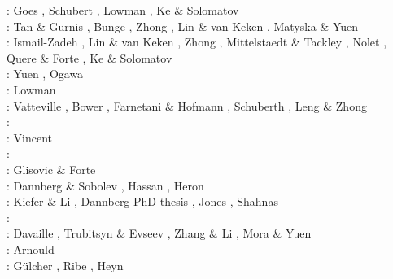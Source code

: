 \begin{scriptsize}
\twothousandfour: Goes \etal \cite{goch04}, Schubert \etal \cite{scmo04}, Lowman \etal \cite{lokg04},
                  Ke \& Solomatov \cite{keso04} \\
\twothousandfive: Tan \& Gurnis \cite{tagu05}, Bunge \cite{bung05}, Zhong \cite{zhon05}, 
                  Lin \& van Keken \cite{liva05}, Matyska \& Yuen \cite{mayu05}\\
\twothousandsix: Ismail-Zadeh \etal \cite{isst06}, Lin \& van Keken \cite{liva06a,liva06b}, 
                 Zhong \cite{zhon06}, Mittelstaedt \& Tackley \cite{mita06},
                 Nolet \etal \cite{nokm06}, Quere \& Forte \cite{qufo06}, Ke \& Solomatov \cite{keso06}\\
\twothousandseven: Yuen \etal \cite{yumh07}, Ogawa \cite{ogaw07}\\
\twothousandeight: Lowman \etal \cite{logg08} \\
\twothousandnine: Vatteville \etal \cite{vavl09}, Bower \etal \cite{bogj09},
                  Farnetani \& Hofmann \cite{faho09}, Schuberth \etal \cite{scbs09b},
                  Leng \& Zhong \cite{lezh09}\\
\twothousandeleven: \cite{toyu11}\cite{talz11}\cite{burk11}\cite{memm11}\cite{dalt11}\cite{tree11}\\
\twothousandtwelve: Vincent \etal{} \cite{viym12}\\
\twothousandthirteen: \cite{dagm13}\cite{madd13}\cite{ande13}\cite{vadv13}\\
\twothousandfourteen: Glisovic \& Forte \cite{glfo14} \\
\twothousandfifteen: Dannberg \& Sobolev \cite{daso15}, Hassan \etal \cite{hafg15}, 
                     Heron \etal \cite{hels15}\\
\twothousandsixteen: Kiefer \& Li \cite{kili16}, Dannberg PhD thesis \cite{dannbergphd}, 
                     Jones \etal \cite{jodc16}, Shahnas \etal \cite{shpy16}\\
\twothousandseventeen: \cite{moyu17}\cite{lizh17}\\
\twothousandeighteen: Davaille \etal \cite{dacc18}, Trubitsyn \& Evseev \cite{trev18}, 
                      Zhang \& Li \cite{zhli18}, Mora \& Yuen \cite{moyu18}\\
\twothousandnineteen: Arnould \etal \cite{argc19}\\
\twothousandtwenty: G{\"u}lcher \etal \cite{gugm20}, Ribe \etal \cite{rits20},
                    Heyn \etal \cite{hect20b}
\end{scriptsize}

